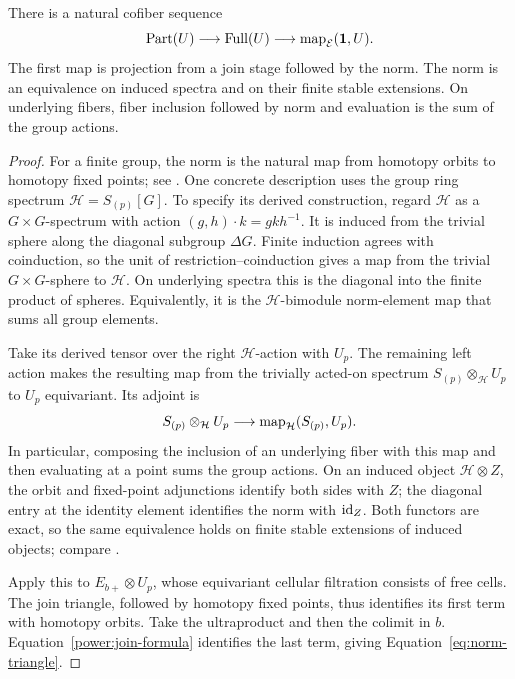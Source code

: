 \begin{lemma}
\label{layer:norm-model}
There is a natural cofiber sequence
\begin{equation}
 \label{eq:norm-triangle}
 \operatorname{Part}(U)\longrightarrow
 \operatorname{Full}(U)\longrightarrow
 \operatorname{map}_{\mathcal E}(\mathbf 1,U).
\end{equation}
The first map is projection from a join stage followed by the norm.
The norm is an equivalence on induced spectra and on their finite
stable extensions. On underlying fibers, fiber inclusion followed
by norm and evaluation is the sum of the group actions.
\end{lemma}

\begin{proof}
For a finite group, the norm is the natural map from homotopy orbits
to homotopy fixed points; see
\cite[Definition~I.1.10 and Example~I.1.11]{NS2018}. One concrete
description uses the group ring spectrum $\mathcal H=S_{(p)}[G]$.
To specify its derived construction, regard $\mathcal H$ as a
$G\times G$-spectrum with action $(g,h)\cdot k=gkh^{-1}$.
It is induced from the trivial sphere along the diagonal subgroup
$\Delta G$. Finite induction agrees with coinduction, so the unit
of restriction--coinduction gives a map from the trivial
$G\times G$-sphere to $\mathcal H$. On underlying spectra this
is the diagonal into the finite product of spheres. Equivalently,
it is the $\mathcal H$-bimodule norm-element map that sums all
group elements.

Take its derived tensor over the right $\mathcal H$-action with
$U_p$. The remaining left action makes the resulting map
from the trivially acted-on spectrum $S_{(p)}\otimes_{\mathcal H}U_p$
to $U_p$ equivariant. Its adjoint is
\[
 S_{(p)}\otimes_{\mathcal H}U_p
 \longrightarrow\operatorname{map}_{\mathcal H}(S_{(p)},U_p).
\]
In particular, composing the inclusion of an underlying fiber with
this map and then evaluating at a point sums the group actions.
On an induced object $\mathcal H\otimes Z$, the orbit and
fixed-point adjunctions identify both sides with $Z$; the diagonal
entry at the identity element identifies the norm with
$\operatorname{id}_Z$. Both functors are exact, so the same
equivalence holds on finite stable extensions of induced objects;
compare \cite[Lemma~I.3.8]{NS2018}.

Apply this to $E_{b+}\otimes U_p$, whose equivariant cellular
filtration consists of free cells. The join triangle, followed by
homotopy fixed points, thus identifies its first term with homotopy
orbits. Take the ultraproduct and then the colimit in $b$.
Equation~\eqref{power:join-formula} identifies the last term, giving
Equation~\eqref{eq:norm-triangle}.
\end{proof}

